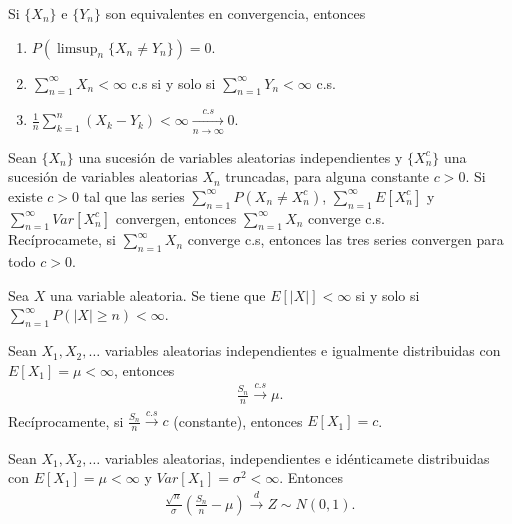 \begin{teo}
    Si $\{X_n\}$ e $\{Y_n\}$ son equivalentes en convergencia, entonces
    \begin{enumerate}
        \item $P\left( \limsup_n \{X_n \not = Y_n \}\right) = 0$.
        \item $\sum_{n=1}^{\infty} X_n < \infty$ c.s si y solo si $\sum_{n=1}^{\infty} Y_n < \infty$ c.s.
        \item $\frac{1}{n} \sum_{k=1}^{n} (X_k -Y_k) < \infty \xrightarrow[n \to \infty]{c.s} 0$. 
    \end{enumerate}
\end{teo}
\begin{teo}
    Sean $\{X_n\}$ una sucesión de variables aleatorias independientes y $\{X_n^c\}$ una sucesión de variables aleatorias $X_n$ truncadas, para alguna constante $c>0$. Si existe $c>0$ tal que las series $\sum_{n=1}^{\infty} P(X_n \not = X_n^c)$, $\sum_{n=1}^{\infty} E[X_n^c]$ y $\sum_{n=1}^{\infty} Var[X_n^c]$ convergen, entonces $\sum_{n=1}^{\infty} X_n$ converge c.s.
    \\
    \newline
    Recíprocamete, si $\sum_{n=1}^{\infty} X_n$ converge c.s, entonces las tres series convergen para todo $c>0$.
\end{teo}

\begin{lema}
    Sea $X$ una variable aleatoria. Se tiene que $E[|X|] < \infty$ si y solo si \newline $\sum_{n=1}^{\infty} P(|X| \ge n) < \infty$.
\end{lema}

\begin{teo}
    Sean $X_1,X_2,\ldots$ variables aleatorias independientes e igualmente distribuidas con $E[X_1] = \mu< \infty$, entonces
    \begin{align*}
        \frac{S_n}{n} \xrightarrow[]{c.s} \mu.
    \end{align*}
    Recíprocamente, si $\frac{S_n}{n} \xrightarrow[]{c.s} c$ (constante), entonces $E[X_1] = c$.
\end{teo}

\begin{teo}
    Sean $X_1, X_2, \ldots$ variables aleatorias, independientes e idénticamete distribuidas con $E[X_1] = \mu < \infty$ y $Var[X_1] = \sigma^2 < \infty$. Entonces
    \begin{align*}
        \frac{\sqrt{n}}{\sigma} \left( \frac{S_n}{n} - \mu \right) \xrightarrow[\quad]{d} Z \sim N(0,1).
    \end{align*}
\end{teo}

